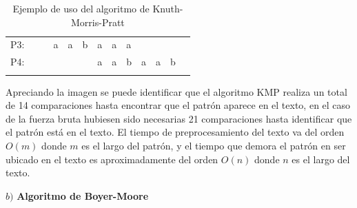 \begin{table}[h]
\begin{tabular}{lllllllllllll}
  P3:                      &                        & \multicolumn{1}{l}{}  & \multicolumn{1}{l}{a}                         & \multicolumn{1}{l}{a}                         & \multicolumn{1}{l}{b} & \multicolumn{1}{l}{a}                         & \multicolumn{1}{l}{a}                         & \multicolumn{1}{l}{\cellcolor[HTML]{FD6864}a} &                                                &                                                &                                                &                        \\
 P4:                    &                        &                        &                                                &                                                & \multicolumn{1}{l}{}  & \multicolumn{1}{l}{\cellcolor[HTML]{9AFF99}a} & \multicolumn{1}{l}{\cellcolor[HTML]{9AFF99}a} & \multicolumn{1}{l}{\cellcolor[HTML]{9AFF99}b} & \multicolumn{1}{l}{\cellcolor[HTML]{9AFF99}a} & \multicolumn{1}{l}{\cellcolor[HTML]{9AFF99}a} & \multicolumn{1}{l}{\cellcolor[HTML]{9AFF99}b} &                        \\
                        &                        &                        &                                                &                                                &                        &                                                &                                                &                                                &                                                &                                                &                                                &                       
\end{tabular}
\caption{Ejemplo de uso del algoritmo de Knuth-Morris-Pratt}
\end{table}

Apreciando la imagen se puede identificar que el algoritmo KMP realiza un total de 14 comparaciones hasta encontrar que el patrón aparece en el texto, en el caso de la fuerza bruta hubiesen sido necesarias 21 comparaciones hasta identificar que el patrón está en el texto.
El tiempo de preprocesamiento del texto va del orden $O(m)$ donde $m$ es el largo del patrón, y el tiempo que demora el patrón en ser ubicado en el texto es aproximadamente del orden $O(n)$ donde $n$ es el largo del texto.

$b)$ \textbf{Algoritmo de Boyer-Moore}


